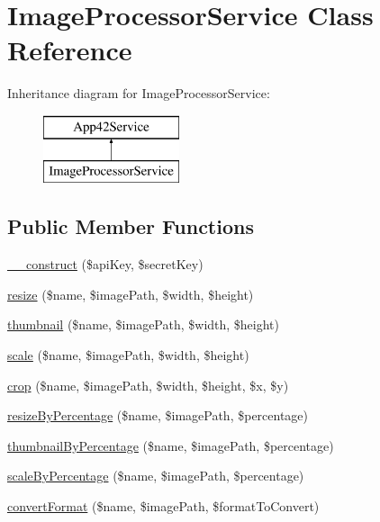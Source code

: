 \hypertarget{class_image_processor_service}{\section{Image\+Processor\+Service Class Reference}
\label{class_image_processor_service}
}
Inheritance diagram for Image\+Processor\+Service\+:\begin{figure}[H]
\begin{center}
\leavevmode
\includegraphics[height=2.000000cm]{class_image_processor_service}
\end{center}
\end{figure}
\subsection*{Public Member Functions}
\begin{DoxyCompactItemize}
\item 
\hyperlink{class_image_processor_service_a49f2ad222e06420736d750e167d55d7c}{\+\_\+\+\_\+construct} (\$api\+Key, \$secret\+Key)
\item 
\hyperlink{class_image_processor_service_a1e39ecb4efe12af4ac7ff3ef91438c84}{resize} (\$name, \$image\+Path, \$width, \$height)
\item 
\hyperlink{class_image_processor_service_ac471620745d08e2a537cdc9a4df30c40}{thumbnail} (\$name, \$image\+Path, \$width, \$height)
\item 
\hyperlink{class_image_processor_service_a32e4399c5d63bab312cd0e9006d73c75}{scale} (\$name, \$image\+Path, \$width, \$height)
\item 
\hyperlink{class_image_processor_service_a41a262e76b699b7373dff531ad4e1a74}{crop} (\$name, \$image\+Path, \$width, \$height, \$x, \$y)
\item 
\hyperlink{class_image_processor_service_a9cd2ff744224fdd1f017846395061ade}{resize\+By\+Percentage} (\$name, \$image\+Path, \$percentage)
\item 
\hyperlink{class_image_processor_service_af338aa16f1f3804bebbc169c81488feb}{thumbnail\+By\+Percentage} (\$name, \$image\+Path, \$percentage)
\item 
\hyperlink{class_image_processor_service_a1f619c45372ce453fc15fff50d114df9}{scale\+By\+Percentage} (\$name, \$image\+Path, \$percentage)
\item 
\hyperlink{class_image_processor_service_acd6f29b135b92a443c5a48352c09e342}{convert\+Format} (\$name, \$image\+Path, \$format\+To\+Convert)
\end{DoxyCompactItemize}
